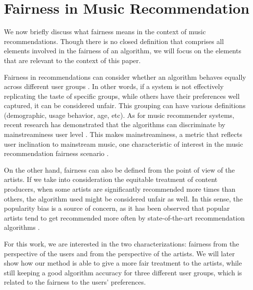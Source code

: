 \documentclass{article}
\begin{document}








\section{Fairness in Music Recommendation}\label{sec:unfairness}


We now briefly discuss what fairness means
in the context of music recommendations. 
Though there is no closed definition that 
comprises all elements involved in the fairness
of an algorithm, we will focus on the elements that are 
relevant to the context of this paper. 

Fairness in recommendations can consider whether
an algorithm behaves equally across different user 
groups \cite{ekstrand2018all}. In other words, if a 
system is not effectively replicating the taste of specific 
groups, while others have their preferences well 
captured, it can be considered unfair. This 
grouping can have various definitions 
(demographic, usage behavior, age, etc). 
As for music recommender systems, recent research 
has demonstrated that the algorithms can 
discriminate by mainstreaminess user level \cite{van2013deep}.
This makes mainstreaminess, a metric that reflects user
inclination to mainstream music, one characteristic of 
interest in the music recommendation fairness 
scenario \cite{pap_unfairness}. 

On the other hand, fairness can also be defined 
from the point of view of the artists. 
If we take into consideration the equitable treatment of 
content producers, when some artists are significantly 
recommended more times than others, the algorithm used 
might be considered unfair as well. In this sense, 
the popularity bias is a source of concern, as it has
been observed that popular artists tend to get recommended
more often by state-of-the-art recommendation algorithms
\cite{celma2008hits, pap_unfairness}. 

For this work, we are interested in the
two characterizations: fairness from the
perspective of the users and from
the perspective of the artists. We will 
later show how our method is able to give a more
fair treatment to the artists, while still
keeping a good algorithm accuracy for three
different user groups, which is related to the
fairness to the users' preferences. 
\end{document}
